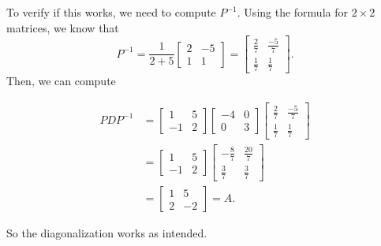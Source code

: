 \documentclass{ximera}
\begin{document}
\begin{exampleSol}
    To verify if this works, we need to compute $P^{-1}.$ Using the formula for $2\times 2$ matrices, we know that
    \[ 
        P^{-1} = \frac{1}{2 + 5}
        \begin{bmatrix} 
            2 & -5 \\ 
            1 & 1 
        \end{bmatrix} 
        = \begin{bmatrix} 
            \frac{2}{7} & \frac{-5}{7} \\ 
            \frac{1}{7} & \frac{1}{7}
        \end{bmatrix}. 
    \] 
    Then, we can compute
    
    \[
        \begin{split}
            PDP^{-1} &= 
            \begin{bmatrix} 
                1 & 5 \\ 
                -1 & 2 
            \end{bmatrix}
            \begin{bmatrix} 
                -4 & 0 \\ 
                0 & 3 
            \end{bmatrix}
            \begin{bmatrix} 
                \frac{2}{7} & \frac{-5}{7} \\ 
                \frac{1}{7} & \frac{1}{7}
            \end{bmatrix} \\
            &= 
            \begin{bmatrix} 
                1 & 5 \\ 
                -1 & 2 
            \end{bmatrix} 
            \begin{bmatrix} 
                -\frac{8}{7} & \frac{20}{7} \\ 
                \frac{3}{7} & \frac{3}{7} 
            \end{bmatrix} \\
            &= 
            \begin{bmatrix} 
                1 & 5 \\ 
                2 & -2 
            \end{bmatrix} = A.
        \end{split}
    \]
    
    So the diagonalization works as intended.
\end{exampleSol}
\end{document}
